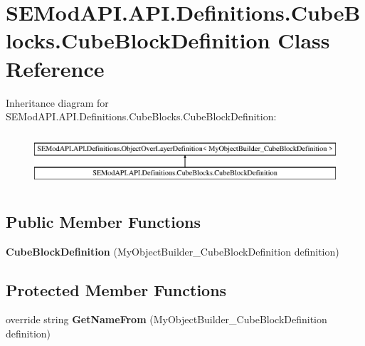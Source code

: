 \hypertarget{class_s_e_mod_a_p_i_1_1_a_p_i_1_1_definitions_1_1_cube_blocks_1_1_cube_block_definition}{}\section{S\+E\+Mod\+A\+P\+I.\+A\+P\+I.\+Definitions.\+Cube\+Blocks.\+Cube\+Block\+Definition Class Reference}
\label{class_s_e_mod_a_p_i_1_1_a_p_i_1_1_definitions_1_1_cube_blocks_1_1_cube_block_definition}
Inheritance diagram for S\+E\+Mod\+A\+P\+I.\+A\+P\+I.\+Definitions.\+Cube\+Blocks.\+Cube\+Block\+Definition\+:\begin{figure}[H]
\begin{center}
\leavevmode
\includegraphics[height=1.985816cm]{class_s_e_mod_a_p_i_1_1_a_p_i_1_1_definitions_1_1_cube_blocks_1_1_cube_block_definition}
\end{center}
\end{figure}
\subsection*{Public Member Functions}
\begin{DoxyCompactItemize}
\item 
\hypertarget{class_s_e_mod_a_p_i_1_1_a_p_i_1_1_definitions_1_1_cube_blocks_1_1_cube_block_definition_aae1e898184f1cb01c6a342b84c16d518}{}{\bfseries Cube\+Block\+Definition} (My\+Object\+Builder\+\_\+\+Cube\+Block\+Definition definition)\label{class_s_e_mod_a_p_i_1_1_a_p_i_1_1_definitions_1_1_cube_blocks_1_1_cube_block_definition_aae1e898184f1cb01c6a342b84c16d518}

\end{DoxyCompactItemize}
\subsection*{Protected Member Functions}
\begin{DoxyCompactItemize}
\item 
\hypertarget{class_s_e_mod_a_p_i_1_1_a_p_i_1_1_definitions_1_1_cube_blocks_1_1_cube_block_definition_a26dce87624662ebdbbbbe959fd0f4729}{}override string {\bfseries Get\+Name\+From} (My\+Object\+Builder\+\_\+\+Cube\+Block\+Definition definition)\label{class_s_e_mod_a_p_i_1_1_a_p_i_1_1_definitions_1_1_cube_blocks_1_1_cube_block_definition_a26dce87624662ebdbbbbe959fd0f4729}

\end{DoxyCompactItemize}
